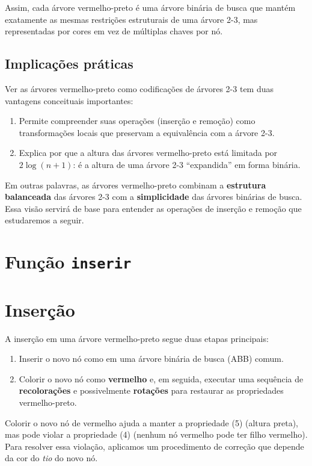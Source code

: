 Assim, cada árvore vermelho-preto é uma árvore binária de busca que mantém exatamente as mesmas restrições estruturais de uma árvore 2-3, mas representadas por cores em vez de múltiplas chaves por nó.

\subsection*{Implicações práticas}

Ver as árvores vermelho-preto como codificações de árvores 2-3 tem duas vantagens conceituais importantes:
\begin{enumerate}
\item Permite compreender suas operações (inserção e remoção) como transformações locais que preservam a equivalência com a árvore 2-3.
\item Explica por que a altura das árvores vermelho-preto está limitada por $2 \log (n + 1)$: é a altura de uma árvore 2-3 “expandida” em forma binária.
\end{enumerate}

Em outras palavras, as árvores vermelho-preto combinam a \textbf{estrutura balanceada} das árvores 2-3 com a \textbf{simplicidade} das árvores binárias de busca.
Essa visão servirá de base para entender as operações de inserção e remoção que estudaremos a seguir.


\section{Função {\tt inserir}}

\section{Inserção}

A inserção em uma árvore vermelho-preto segue duas etapas principais:

\begin{enumerate}
    \item Inserir o novo nó como em uma árvore binária de busca (ABB) comum.
    \item Colorir o novo nó como \textbf{vermelho} e, em seguida, executar uma sequência de \textbf{recolorações} e possivelmente \textbf{rotações} para restaurar as propriedades vermelho-preto.
\end{enumerate}

Colorir o novo nó de vermelho ajuda a manter a propriedade (5) (altura preta), mas pode violar a propriedade (4) (nenhum nó vermelho pode ter filho vermelho). Para resolver essa violação, aplicamos um procedimento de correção que depende da cor do \textit{tio} do novo nó.

